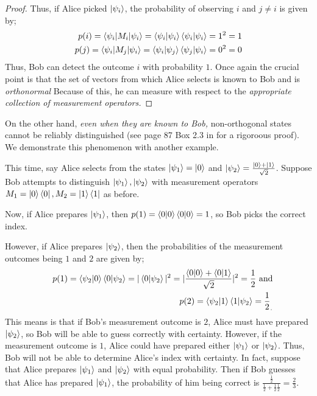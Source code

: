 {\begin{proof}
Thus, if Alice picked $\ket{\psi_i}$, the probability of observing $i$ and $j\neq i$ is given by;
\begin{align}
p(i)=\braket{\psi_i | M_i |\psi_i}=\braket{\psi_i |\psi_i}\braket{\psi_i |\psi_i}=1^2=1\\
p(j)=\braket{\psi_i | M_j |\psi_i}=\braket{\psi_i |\psi_j}\braket{\psi_j |\psi_i}=0^2=0\\
\end{align}
Thus, Bob can detect the outcome $i$ with probability $1$.  Once again the crucial point is that the set of vectors from which Alice selects is known to Bob and is {\emph{orthonormal}} Because of this, he can measure with respect to the {\emph{appropriate collection of measurement operators.}} 
\end{proof}

On the other hand, {\emph{even when they are known to Bob,}} non-orthogonal states cannot be reliably distinguished (see page 87 Box 2.3 in \cite{Nielsen} for a rigoroous proof).  We demonstrate this phenomenon with another example.
\begin{example}
This time, say Alice selects from the states $\ket{\psi_1}=\ket{0}$ and  $\ket{\psi_2}=\frac{\ket{0}+\ket{1}}{\sqrt{2}}$. Suppose Bob attempts to distinguish $\ket{\psi_1}, \ket{\psi_2}$ with measurement operators $M_1=\ket{0}\bra{0}, M_2=\ket{1}\bra{1}$ as before.

Now, if Alice prepares $\ket{\psi_1}$, then $p(1)=\braket{0 |0}\braket{0|0}=1$, so Bob picks the correct index. 

However, if Alice prepares $\ket{\psi_2}$, then the probabilities of the measurement outcomes being $1$ and $2$ are given by;
\begin{eqnarray}
    & &p(1)=\braket{\psi_2|0}\braket{0|\psi_2}=|\braket{0|\psi_2}|^2=|\frac{\braket{0|0}+\braket{0|1}}{\sqrt{2}}|^2=\frac{1}{2}\textrm{  and}\\
    & &p(2)=\braket{\psi_2|1}\braket{1|\psi_2}={\frac{1}{2}}_.
\end{eqnarray}
This means is that if Bob's measurement outcome is $2$, Alice must have prepared $\ket{\psi_2}$, so Bob will be able to guess correctly with certainty. However, if the measurement outcome is $1$, Alice could have prepared either $\ket{\psi_1}$ or $\ket{\psi_2}$.  Thus, Bob will not be able to determine Alice's index with certainty.  In fact, suppose that Alice prepares $\ket{\psi_1}$ and $\ket{\psi_2}$ with equal probability.  Then if Bob guesses that Alice has prepared $\ket{\psi_1}$, the probability of him being correct is $\frac{\frac{1}{2}}{\frac{1}{2}+\frac{1}{2}\frac{1}{2}}=\frac{2}{3}$.
\end{example}

}
